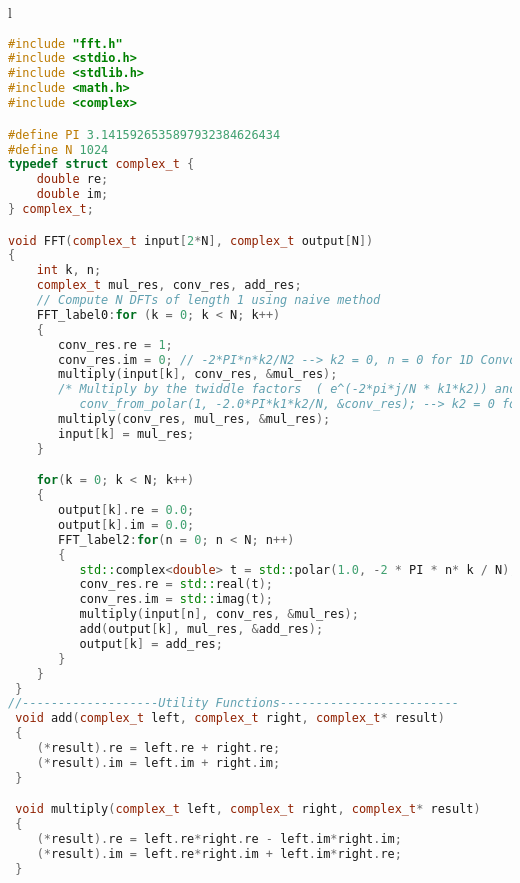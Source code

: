 \begin{table}[!h]
\centering
\caption{Non-recursive 1-D FFT}
\label{fhewcode2:fft1}
\begin{tabular}{l}
\toprule
\begin{lstlisting}[columns=fullflexible, language=C++,escapechar=\$]
#include "fft.h"
#include <stdio.h>
#include <stdlib.h>
#include <math.h>
#include <complex>

#define PI 3.1415926535897932384626434
#define N 1024
typedef struct complex_t {
    double re;
    double im;
} complex_t;

void FFT(complex_t input[2*N], complex_t output[N])
{
    int k, n;
    complex_t mul_res, conv_res, add_res;
    // Compute N DFTs of length 1 using naive method
    FFT_label0:for (k = 0; k < N; k++)
    {
       conv_res.re = 1;
       conv_res.im = 0; // -2*PI*n*k2/N2 --> k2 = 0, n = 0 for 1D Convolution
       multiply(input[k], conv_res, &mul_res);
       /* Multiply by the twiddle factors  ( e^(-2*pi*j/N * k1*k2)) and transpose
          conv_from_polar(1, -2.0*PI*k1*k2/N, &conv_res); --> k2 = 0 for 1D Convolution */
       multiply(conv_res, mul_res, &mul_res);
       input[k] = mul_res;
    }

    for(k = 0; k < N; k++)
    {
       output[k].re = 0.0;
       output[k].im = 0.0;
       FFT_label2:for(n = 0; n < N; n++)
       {
    	  std::complex<double> t = std::polar(1.0, -2 * PI * n* k / N);
    	  conv_res.re = std::real(t);
    	  conv_res.im = std::imag(t);
          multiply(input[n], conv_res, &mul_res);
          add(output[k], mul_res, &add_res);
          output[k] = add_res;
       }
    }
 }
//-------------------Utility Functions-------------------------
 void add(complex_t left, complex_t right, complex_t* result)
 {
    (*result).re = left.re + right.re;
    (*result).im = left.im + right.im;
 }

 void multiply(complex_t left, complex_t right, complex_t* result)
 {
    (*result).re = left.re*right.re - left.im*right.im;
    (*result).im = left.re*right.im + left.im*right.re;
 }
\end{lstlisting}
\\
\bottomrule
\end{tabular}
\end{table}

